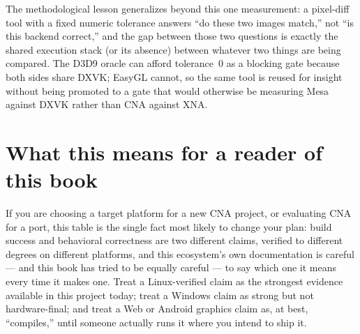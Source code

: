 The methodological lesson generalizes beyond this one measurement: a pixel-diff tool with a fixed
numeric tolerance answers ``do these two images match,'' not ``is this backend correct,'' and the
gap between those two questions is exactly the shared execution stack (or its absence) between
whatever two things are being compared. The D3D9 oracle can afford tolerance~0 as a blocking gate
because both sides share DXVK; EasyGL cannot, so the same tool is reused for insight without being
promoted to a gate that would otherwise be measuring Mesa against DXVK rather than CNA against
XNA.

\section{What this means for a reader of this book}

If you are choosing a target platform for a new CNA project, or evaluating CNA for a port,
this table is the single fact most likely to change your plan: build success and behavioral
correctness are two different claims, verified to different degrees on different platforms,
and this ecosystem's own documentation is careful --- and this book has tried to be equally
careful --- to say which one it means every time it makes one. Treat a Linux-verified claim as
the strongest evidence available in this project today; treat a Windows claim as strong but
not hardware-final; and treat a Web or Android graphics claim as, at best, ``compiles,'' until
someone actually runs it where you intend to ship it.
